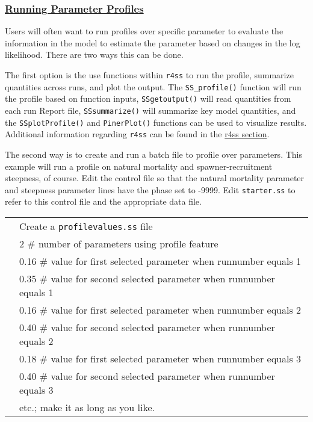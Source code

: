 \hypertarget{ParamProfiles}{}
\subsubsection[Running Parameter Profiles]{\protect\hyperlink{ParamProfiles}{Running Parameter Profiles}}
Users will often want to run profiles over specific parameter to evaluate the information in the model to estimate the parameter based on changes in the log likelihood. There are two ways this can be done.

The first option is the use functions within \texttt{r4ss} to run the profile, summarize quantities across runs, and plot the output. The \texttt{SS\_profile()} function will run the profile based on function inputs, \texttt{SSgetoutput()} will read quantities from each run Report file, \texttt{SSsummarize()} will summarize key model quantities, and the \texttt{SSplotProfile()} and \texttt{PinerPlot()} functions can be used to visualize results.  Additional information regarding \texttt{r4ss} can be found in the \hyperref[sec:r4ss]{r4ss section}. 

The second way is to create and run a batch file to profile over parameters. This example will run a profile on natural mortality and spawner-recruitment steepness, of course. Edit the control file so that the natural mortality parameter and steepness parameter lines have the phase set to -9999. Edit \texttt{starter.ss} to refer to this control file and the appropriate data file.

	\begin{longtable}{p{0.5cm} p{16cm}}		
		& Create a \texttt{profilevalues.ss} file \\
		& 2	\# number of parameters using profile feature \\
		& 0.16	\# value for first selected parameter when runnumber equals 1 \\
		& 0.35	\# value for second selected parameter when runnumber equals 1 \\
		& 0.16	\# value for first selected parameter when runnumber equals 2 \\
		& 0.40	\# value for second selected parameter when runnumber equals 2 \\
		& 0.18	\# value for first selected parameter when runnumber equals 3 \\
		& 0.40	\# value for second selected parameter when runnumber equals 3 \\
		& etc.;  make it as long as you like. \\
	\end{longtable}

